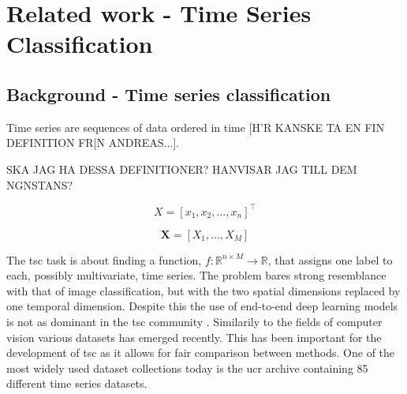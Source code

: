 \chapter{Related work - Time Series Classification} \label{sec:tsc} \label{ch:tsc}
\section{Background - Time series classification}
Time series are sequences of data ordered in time [H'R KANSKE TA EN FIN DEFINITION FR[N ANDREAS...].

SKA JAG HA DESSA DEFINITIONER? HANVISAR JAG TILL DEM NGNSTANS?

\begin{definition}
  $$X = \left[x_1, x_2, \hdots, x_n\right]^\intercal$$
  \label{def:uts}
\end{definition}

\begin{definition}
    $$\pmb{X} = \left[X_1, \hdots, X_M\right]$$
\end{definition}

The \gls{tsc} task is about finding a function, $f: \mathbb{R}^{n \times M} \rightarrow \mathbb{R}$, that assigns one label to each, possibly multivariate, time series. The problem bares strong resemblance with that of image classification, but with the two spatial dimensions replaced by one temporal dimension. Despite this the use of end-to-end deep learning models is not as dominant in the \gls{tsc} community \cite{IsmailFawaz2019}. Similarily to the fields of computer vision various datasets has emerged recently. This has been important for the development of \gls{tsc} as it allows for fair comparison between methods. One of the most widely used dataset collections today is the \gls{ucr} archive \cite{Dau2018} containing 85 different time series datasets.

